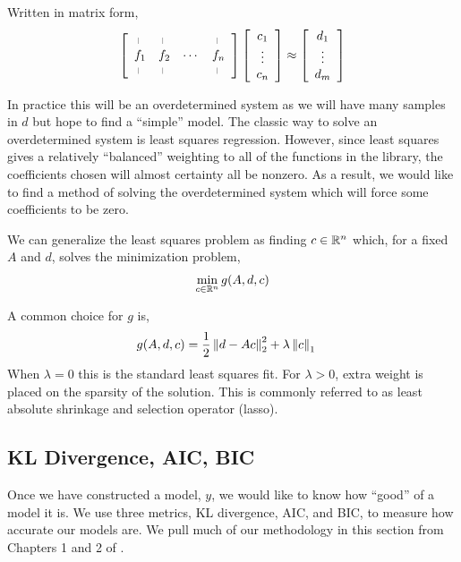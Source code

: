 \documentclass[10pt]{article}
\newcommand{\vln}{\rotatebox{90}{--}}
\begin{document}
Written in matrix form,
\begin{align*}
    \left[\begin{array}{cccc}
     \vln & \vln & & \vln \\
    f_1 & f_2 & \cdots & f_n \\
    \vln & \vln & & \vln
    \end{array}\right]
    \left[\begin{array}{c}c_1 \\ \vdots \\ c_n\end{array}\right]
    \approx
    \left[\begin{array}{c}d_1 \\ \vdots \\ d_m \end{array}\right]
\end{align*}

In practice this will be an overdetermined system as we will have many samples in \( d \) but hope to find a ``simple'' model. The classic way to solve an overdetermined system is least squares regression. However, since least squares gives a relatively ``balanced'' weighting to all of the functions in the library, the coefficients chosen will almost certainty all be nonzero. As a result, we would like to find a method of solving the overdetermined system which will force some coefficients to be zero.

We can generalize the least squares problem as finding \( c\in\mathbb{R}^n \) which, for a fixed \( A \) and \( d \), solves the minimization problem,
\begin{align}
    \min_{c\in\mathbb{R}^n} g(A,d,c)
\end{align}

A common choice for \( g \) is,
 \begin{align}
    g(A,d,c) &= \dfrac{1}{2}\left\lVert d-Ac\right\rVert_2^2 + \lambda \left\lVert c\right\rVert_1 \label{lasso}
\end{align}
When \( \lambda = 0 \) this is the standard least squares fit. For \( \lambda > 0 \), extra weight is placed on the sparsity of the solution. This is commonly referred to as least absolute shrinkage and selection operator (lasso).

\subsection{KL Divergence, AIC, BIC}
Once we have constructed a model, \( y \), we would like to know how ``good'' of a model it is. We use three metrics, KL divergence, AIC, and BIC, to measure how accurate our models are. We pull much of our methodology in this section from Chapters 1 and 2 of \cite{Burnham}.%
\end{document}
